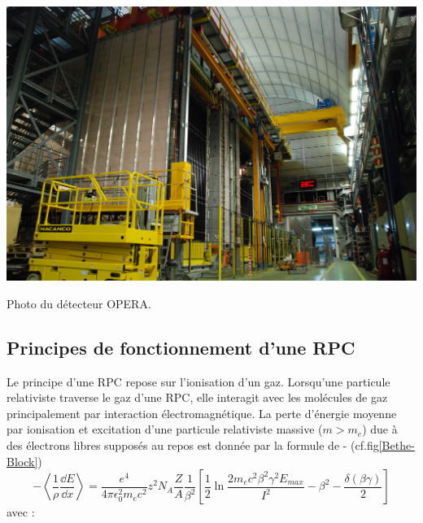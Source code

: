 \marginpar
{
	\centering
	\includegraphics[width=\marginparwidth]{RPC/OPERA.jpg}
	\captionsetup{type=figure}\caption{Photo du détecteur OPERA.}
	\label{opera}
}

\subsection{Principes de fonctionnement d'une RPC}
Le principe d'une RPC repose sur l'ionisation d'un gaz. Lorsqu'une particule relativiste traverse le gaz d'une RPC, elle interagit avec les molécules de gaz principalement par interaction électromagnétique. La perte d'énergie moyenne par ionisation et excitation d'une particule relativiste massive ($m>m_{e}$) due à des électrons libres supposés au repos est donnée par la formule de - (cf.fig\ref{Bethe-Block})
\begin{equation}
-\left<\frac{1}{\rho}\frac{\dd E}{\dd x}\right>=\frac{e^{4}}{4\pi \epsilon_{0}^{2}m_{e}c^{2}}z^{2}N_{A}\frac{Z}{A}\frac{1}{\beta^{2}}\left[\frac{1}{2}\ln\frac{2m_{e}c^{2}\beta^{2}\gamma^{2}E_{max}}{I^{2}}-\beta^{2}-\frac{\delta(\beta\gamma)}{2}\right]
\end{equation}
avec :

